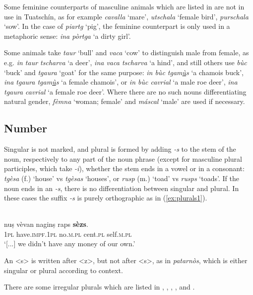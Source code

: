 Some feminine counterparts of masculine animals which are listed in \citet[239f.]{Spescha1989} are not in use in Tuatschín, as for example \textit{cavalla} `mare', \textit{utschala} `female bird', \textit{purschala} `sow'. In the case of \textit{piartg} `pig', the feminine counterpart is only used in a metaphoric sense: \textit{ina pòrtga} `a dirty girl'.

Some animals take \textit{taur} `bull' and \textit{vaca} `cow' to distinguish male from female, as e.g. \textit{in taur tscharva} `a deer', \textit{ina vaca tscharva} `a hind', and still others use \textit{bùc} `buck' and \textit{tgaura} `goat' for the same purpose: \textit{in bùc tgam\underline{ù}s} `a chamois buck', \textit{ina tgaura tgam\underline{ù}s} `a female chamois', or \textit{in bùc cavrial} `a male roe deer', \textit{ina tgaura cavrial} `a female roe deer'. Where there are no such nouns differentiating natural gender, \textit{fèmna} `woman; female' and \textit{máscal} `male' are used if necessary.



\subsection{Number}
Singular is not marked, and plural is formed by adding \textit{-s} to the stem of the noun, respectively to any part of the noun phrase (except for masculine plural participles, which take \textit{-i}), whether the stem ends in a vowel or in a consonant: \textit{tgèsa} (f.) `house' vs \textit{tgèsas} `houses', or \textit{rusp} (m.) `toad' vs \textit{rusps} `toads'. If the noun ends in an \textit{-s}, there is no differentiation between singular and plural. In these cases the suffix \textit{-s} is purely orthographic as in (\ref{ex:plurals1}). 

\ea
\label{ex:plurals1}
\\
\gll [...] nuṣ vèvan naginṣ raps \textbf{sèzs}.\\
{} \textsc{1pl} have.\textsc{impf.1pl}  no.\textsc{m.pl} cent.\textsc{pl} self.\textsc{m.pl}\\
\glt `[...] we didn’t have any money of our own.'
\z

An <s> is written after <z>, but not after <s>, as in \textit{patarnòs}, which is either singular or plural according to context.


There are some irregular plurals which are listed in ,  ,  , , and . 

